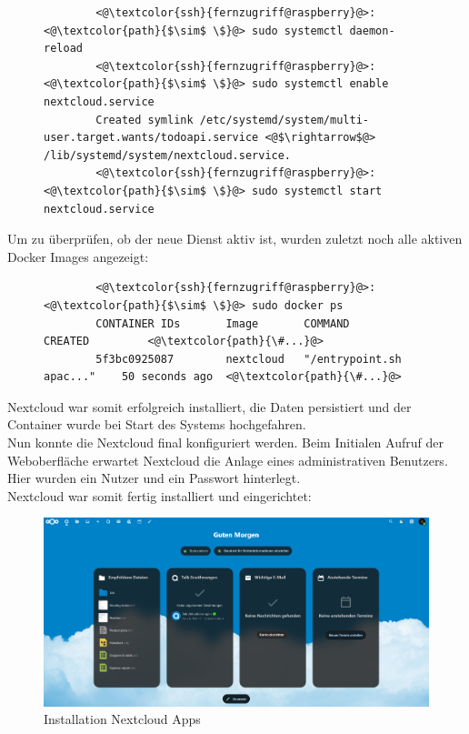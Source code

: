 \documentclass[a4paper, 11pt]{scrartcl}
\begin{document}
\begin{figure}[H]
    \begin{mdframed}[backgroundcolor=bbg]
        \begin{lstlisting}
        <@\textcolor{ssh}{fernzugriff@raspberry}@>:<@\textcolor{path}{$\sim$ \$}@> sudo systemctl daemon-reload
        <@\textcolor{ssh}{fernzugriff@raspberry}@>:<@\textcolor{path}{$\sim$ \$}@> sudo systemctl enable nextcloud.service
        Created symlink /etc/systemd/system/multi-user.target.wants/todoapi.service <@$\rightarrow$@> /lib/systemd/system/nextcloud.service.
        <@\textcolor{ssh}{fernzugriff@raspberry}@>:<@\textcolor{path}{$\sim$ \$}@> sudo systemctl start nextcloud.service
        \end{lstlisting}
    \end{mdframed}
    \label{lst:enable_service}
\end{figure}
Um zu überprüfen, ob der neue Dienst aktiv ist, wurden zuletzt noch alle aktiven Docker Images angezeigt:
\begin{figure}[H]
    \begin{mdframed}[backgroundcolor=bbg]
        \begin{lstlisting}
        <@\textcolor{ssh}{fernzugriff@raspberry}@>:<@\textcolor{path}{$\sim$ \$}@> sudo docker ps
        CONTAINER IDs       Image       COMMAND                     CREATED         <@\textcolor{path}{\#...}@>
        5f3bc0925087        nextcloud   "/entrypoint.sh apac..."    50 seconds ago  <@\textcolor{path}{\#...}@>
        \end{lstlisting}
    \end{mdframed}
    \label{lst:enable_service}
\end{figure}
Nextcloud war somit erfolgreich installiert, die Daten persistiert und der Container wurde bei Start des Systems hochgefahren.
\\
Nun konnte die Nextcloud final konfiguriert werden. Beim Initialen Aufruf der Weboberfläche erwartet Nextcloud die Anlage eines administrativen Benutzers. Hier wurden
ein Nutzer und ein Passwort hinterlegt.
\\
Nextcloud war somit fertig installiert und eingerichtet:
\begin{figure}[H]
    \begin{center}
        \includegraphics[scale=0.2]{Bilder/nextcloud_web_app.png}
        \caption{Installation Nextcloud Apps}
    \end{center}
\end{figure}
\end{document}
